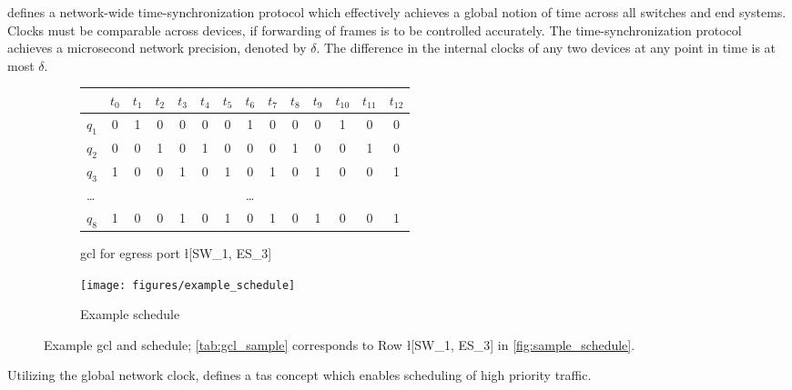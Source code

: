  defines a network-wide time-synchronization protocol which effectively achieves a global notion of time across all switches and end systems.
Clocks must be comparable across devices, if forwarding of frames is to be controlled accurately.
The time-synchronization protocol achieves a microsecond network precision, denoted by $\delta$.
The difference in the internal clocks of any two devices at any point in time is at most $\delta$.
\begin{figure*}[t]
\centering
	\begin{subfigure}{0.4\linewidth}
      \centering
      \bgroup
      \setlength\tabcolsep{0.1cm}
      \begin{tabular}{lccccccccccccc}
             & $t_0$ & $t_1$ & $t_2$ & $t_3$ & $t_4$ & $t_5$ & $t_6$ & $t_7$ & $t_8$ & $t_9$ & $t_{10}$ & $t_{11}$ & $t_{12}$ \\ \hline
      $q_1$  & 0     & 1     & 0     & 0     & 0     & 0     & 1     & 0     & 0     & 0     & 1        & 0        & 0        \\
      $q_2$  & 0     & 0     & 1     & 0     & 1     & 0     & 0     & 0     & 1     & 0     & 0        & 1        & 0        \\
      $q_3$  & 1     & 0     & 0     & 1     & 0     & 1     & 0     & 1     & 0     & 1     & 0        & 0        & 1        \\
      \ldots &      &      &      &      &      &      & \hspace{-0.2cm} \ldots \hspace{-0.2cm}     &      &      &      &         &         &         \\
      $q_8$  & 1     & 0     & 0     & 1     & 0     & 1     & 0     & 1     & 0     & 1     & 0        & 0        & 1       
      \end{tabular}
      \egroup
      \caption{\gls{gcl} for egress port \l[SW_1, ES_3]}
      \label{tab:gcl_sample}
	\end{subfigure}
	\begin{subfigure}{0.55\linewidth}
      \centering
      \texttt{[image: figures/example\_schedule]}
	   \caption{Example schedule}
      \label{fig:sample_schedule}
	\end{subfigure}
   \caption{Example \gls{gcl} and schedule; \autoref{tab:gcl_sample} corresponds to Row \l[SW_1, ES_3] in \autoref{fig:sample_schedule}.}
   \label{fig:sample}
\end{figure*}
Utilizing the global network clock,  defines a \gls{tas} concept which enables scheduling of high priority traffic.

